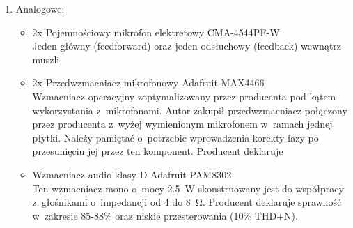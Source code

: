 \begin{enumerate}
	\item Analogowe:
	\begin{itemize}
		\item 2x Pojemnościowy mikrofon elektretowy CMA-4544PF-W\\
		Jeden główny (feedforward) oraz jeden odsłuchowy (feedback) wewnątrz muszli.
		\item 2x Przedwzmacniacz mikrofonowy Adafruit MAX4466\\
		Wzmacniacz operacyjny zoptymalizowany przez producenta pod kątem wykorzystania z~mikrofonami. Autor zakupił przedwzmacniacz połączony przez producenta z~wyżej wymienionym mikrofonem w~ramach jednej płytki. Należy pamiętać o~potrzebie wprowadzenia korekty fazy po przesunięciu jej przez ten komponent. Producent deklaruje 
		\item Wzmacniacz audio klasy D Adafruit PAM8302\\
		Ten wzmacniacz mono o~mocy \SI{2.5}{\W} skonstruowany jest do współpracy z~głośnikami o~impedancji od \SI{4}{} do \SI{8}{\ohm}. Producent deklaruje sprawność w~zakresie 85-88\% \cite{speakeropamp} oraz niskie przesterowania (10\% THD+N).
		

\end{itemize}
\end{enumerate}
